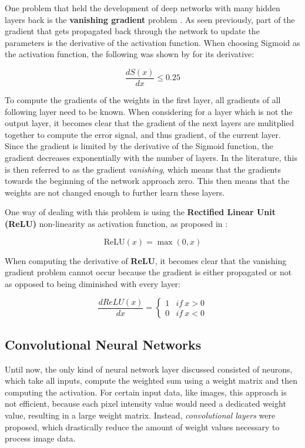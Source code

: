 \label{sec:vanishing-gradient}
One problem that held the development of deep networks with many hidden layers back is the \textbf{vanishing gradient} problem \cite{hochreiter_untersuchungen_1991}\cite{hochreiter_vanishing_1998}.
As seen previously, part of the gradient that gets propagated back through the network to update the parameters is the derivative of the activation function.
When choosing Sigmoid as the activation function, the following was shown by \cite{hochreiter_vanishing_1998} for its derivative:

\begin{equation}
    \frac{dS(x)}{dx} \leq 0.25
\end{equation}

To compute the gradients of the weights in the first layer, all gradients of all following layer need to be known.
When considering  for a layer which is not the output layer, it becomes clear that the gradient of the next layers are mulitplied together to compute the error signal, and thus gradient, of the current layer.
Since the gradient is limited by the derivative of the Sigmoid function, the gradient decreases exponentially with the number of layers.
In the literature, this is then referred to as the gradient \textit{vanishing}, which means that the gradients towards the beginning of the network approach zero.
This then means that the weights are not changed enough to further learn these layers.

One way of dealing with this problem is using the \textbf{Rectified Linear Unit (ReLU)} non-linearity as activation function, as proposed in \cite{nair_rectified_2010}:

\begin{equation}
    \text{ReLU}(x) = \max (0, x)
\end{equation}

When computing the derivative of \textbf{ReLU}, it becomes clear that the vanishing gradient problem cannot occur because the gradient is either propagated or not as opposed to being diminished with every layer:

\begin{equation}
    \frac{d ReLU(x)}{dx} = \begin{cases}
        1 & if ~ x > 0 \\
        0 & if ~ x < 0
    \end{cases}
\end{equation}

\subsection{Convolutional Neural Networks}
Until now, the only kind of neural network layer discussed consisted of neurons, which take all inputs, compute the weighted sum using a weight matrix and then computing the activation.
For certain input data, like images, this approach is not efficient, because each pixel intensity value would need a dedicated weight value, resulting in a large weight matrix.
Instead, \textit{convolutional layers} were proposed, which drastically reduce the amount of weight values necessary to process image data.


